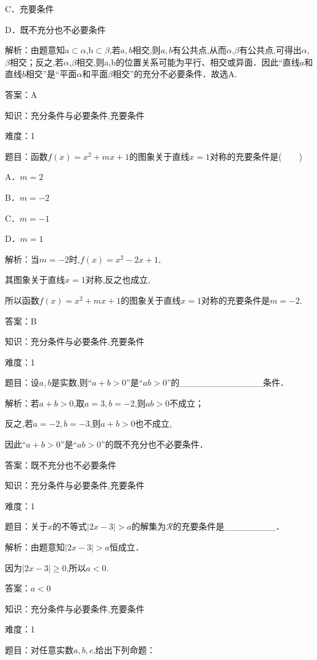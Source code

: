 \documentclass{article} %
\begin{document}
C．充要条件

D．既不充分也不必要条件

解析：由题意知a${\subset }$$\alpha$,b${\subset }$$\beta$,若$a,b$相交,则$a,b$有公共点,从而$\alpha$,$\beta$有公共点,可得出$\alpha$,$\beta$相交；反之,若$\alpha$,$\beta$相交,则a,b的位置关系可能为平行、相交或异面．因此``直线$a$和直线$b$相交''是``平面$\alpha$和平面$\beta$相交''的充分不必要条件．故选A.

答案：A



知识：充分条件与必要条件,充要条件

难度：1

题目：函数$f(x)=x^{2}+mx+1$的图象关于直线$x=1$对称的充要条件是(　　)

A．$m=2$   

B．$m=-2$

C．$m=-1$   

D．$m=1$

解析：当$m=-2$时,$f(x)=x^{2}-2x+1$,

其图象关于直线$x=1$对称,反之也成立,

所以函数$f(x)=x^{2}+mx+1$的图象关于直线$x=1$对称的充要条件是$m=-2$.

答案：B



知识：充分条件与必要条件,充要条件

难度：1

题目：设$a,b$是实数,则``$a+b>0$''是``$ab>0$''的\_\_\_\_\_\_\_\_\_\_\_\_\_条件．

解析：若$a+b>0$,取$a=3,b=-2$,则$ab>0$不成立；

反之,若$a=-2,b=-3$,则$a+b>0$也不成立,

因此``$a+b>0$''是``$ab>0$''的既不充分也不必要条件．

答案：既不充分也不必要条件



知识：充分条件与必要条件,充要条件

难度：1

题目：关于$x$的不等式$|2x-3|>a$的解集为$\mathcal{R}$的充要条件是\_\_\_\_\_\_\_\_．

解析：由题意知$|2x-3|>a$恒成立．

因为$|2x-3|\ge 0$,所以$a<0$.

答案：$a<0$



知识：充分条件与必要条件,充要条件

难度：1

题目：对任意实数$a,b,c$,给出下列命题：
\end{document}
